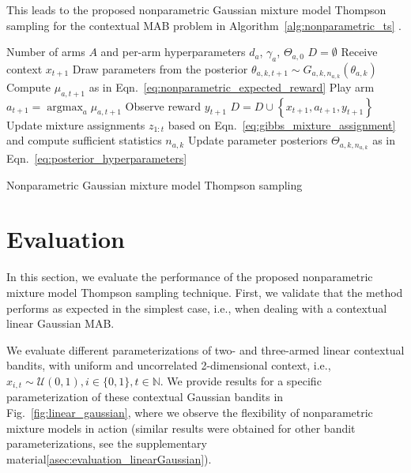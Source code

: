 \documentclass{article}
\def \Natural{{\mathbb N}}
\newcommand{\ie}{i.e., }
\newcommand{\U}[1]{\mathcal{U}\left( #1\right)}
\newcommand{\argmax}{\mathop{\mathrm{argmax}}}
\def\addappendix{}
\begin{document}
This leads to the proposed nonparametric Gaussian mixture model Thompson sampling for the contextual MAB problem in Algorithm~\ref{alg:nonparametric_ts} .

\begin{algorithm}
	\begin{algorithmic}[1]
		 Number of arms $A$ and per-arm hyperparameters $d_a$, $\gamma_a$, $\Theta_{a,0}$
		\STATE $D=\emptyset$
		\STATE Receive context $x_{t+1}$
		\STATE Draw parameters from the posterior $\theta_{a,k,t+1} \sim G_{a,k,n_{a,k}}(\theta_{a,k})$
		\ENDFOR
		\STATE Compute $\mu_{a,t+1}$ as in Eqn.~\eqref{eq:nonparametric_expected_reward}
		\ENDFOR
		\STATE Play arm $a_{t+1}=\argmax_{a}\mu_{a,t+1}$
		\STATE Observe reward $y_{t+1}$
		\STATE $D=D \cup \left\{x_{t+1}, a_{t+1}, y_{t+1}\right\}$
		\STATE Update mixture assignments $z_{1:t}$ based on Eqn.~\eqref{eq:gibbs_mixture_assignment} and compute sufficient statistics $n_{a,k}$
		\STATE Update parameter posteriors $\Theta_{a,k,n_{a,k}}$ as in Eqn.~\eqref{eq:posterior_hyperparameters}
		\ENDWHILE
		\ENDFOR
	\end{algorithmic}
	\caption{Nonparametric Gaussian mixture model Thompson sampling}
	\label{alg:nonparametric_ts}
\end{algorithm}

\section{Evaluation}
\label{sec:evaluation}

In this section, we evaluate the performance of the proposed nonparametric mixture model Thompson sampling technique. First, we validate that the method performs as expected in the simplest case, \ie when dealing with a contextual linear Gaussian MAB.

We evaluate different parameterizations of two- and three-armed linear contextual bandits, with uniform and uncorrelated 2-dimensional context, \ie $x_{i,t}\sim \U{0,1}, i \in \{0,1\}, t \in \Natural$. We provide results for a specific parameterization of these contextual Gaussian bandits in Fig.~\ref{fig:linear_gaussian}, where we observe the flexibility of nonparametric mixture models in action (similar results were obtained for other bandit parameterizations, see \ifx\addappendix\undefined the supplementary material\else \autoref{asec:evaluation_linearGaussian}\fi).
\end{document}
